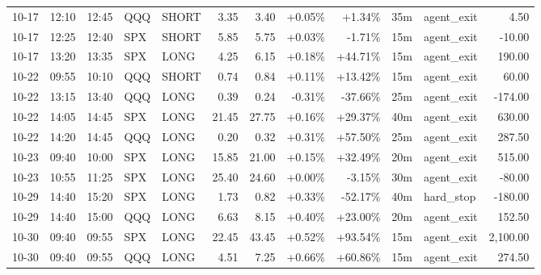 \documentclass[11pt,a4paper]{article}
\begin{document}
\begin{center}
\begin{longtable}{>{\color{txtmain}}l l l l l r r r r r >{\color{txtmain}}l r}
10-17 & 12:10 & 12:45 & QQQ & SHORT & 3.35 & 3.40 & \textcolor{wingreen}{+0.05\%} & \textcolor{wingreen}{+1.34\%} & 35m & agent\_exit & \textcolor{wingreen}{4.50} \\
10-17 & 12:25 & 12:40 & SPX & SHORT & 5.85 & 5.75 & \textcolor{wingreen}{+0.03\%} & \textcolor{lossred}{-1.71\%} & 15m & agent\_exit & \textcolor{lossred}{-10.00} \\
10-17 & 13:20 & 13:35 & SPX & LONG & 4.25 & 6.15 & \textcolor{wingreen}{+0.18\%} & \textcolor{wingreen}{+44.71\%} & 15m & agent\_exit & \textcolor{wingreen}{190.00} \\
10-22 & 09:55 & 10:10 & QQQ & SHORT & 0.74 & 0.84 & \textcolor{wingreen}{+0.11\%} & \textcolor{wingreen}{+13.42\%} & 15m & agent\_exit & \textcolor{wingreen}{60.00} \\
10-22 & 13:15 & 13:40 & QQQ & LONG & 0.39 & 0.24 & \textcolor{lossred}{-0.31\%} & \textcolor{lossred}{-37.66\%} & 25m & agent\_exit & \textcolor{lossred}{-174.00} \\
10-22 & 14:05 & 14:45 & SPX & LONG & 21.45 & 27.75 & \textcolor{wingreen}{+0.16\%} & \textcolor{wingreen}{+29.37\%} & 40m & agent\_exit & \textcolor{wingreen}{630.00} \\
10-22 & 14:20 & 14:45 & QQQ & LONG & 0.20 & 0.32 & \textcolor{wingreen}{+0.31\%} & \textcolor{wingreen}{+57.50\%} & 25m & agent\_exit & \textcolor{wingreen}{287.50} \\
10-23 & 09:40 & 10:00 & SPX & LONG & 15.85 & 21.00 & \textcolor{wingreen}{+0.15\%} & \textcolor{wingreen}{+32.49\%} & 20m & agent\_exit & \textcolor{wingreen}{515.00} \\
10-23 & 10:55 & 11:25 & SPX & LONG & 25.40 & 24.60 & \textcolor{wingreen}{+0.00\%} & \textcolor{lossred}{-3.15\%} & 30m & agent\_exit & \textcolor{lossred}{-80.00} \\
10-29 & 14:40 & 15:20 & SPX & LONG & 1.73 & 0.82 & \textcolor{wingreen}{+0.33\%} & \textcolor{lossred}{-52.17\%} & 40m & hard\_stop & \textcolor{lossred}{-180.00} \\
10-29 & 14:40 & 15:00 & QQQ & LONG & 6.63 & 8.15 & \textcolor{wingreen}{+0.40\%} & \textcolor{wingreen}{+23.00\%} & 20m & agent\_exit & \textcolor{wingreen}{152.50} \\
10-30 & 09:40 & 09:55 & SPX & LONG & 22.45 & 43.45 & \textcolor{wingreen}{+0.52\%} & \textcolor{wingreen}{+93.54\%} & 15m & agent\_exit & \textcolor{wingreen}{2,100.00} \\
10-30 & 09:40 & 09:55 & QQQ & LONG & 4.51 & 7.25 & \textcolor{wingreen}{+0.66\%} & \textcolor{wingreen}{+60.86\%} & 15m & agent\_exit & \textcolor{wingreen}{274.50} \\

\end{longtable}
\end{center}
\end{document}
